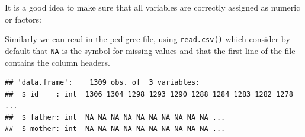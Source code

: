 \documentclass[
  12pt,
]{book}
\newenvironment{Shaded}{\begin{snugshade}}{\end{snugshade}}
\newcommand{\KeywordTok}[1]{\textcolor[rgb]{0.13,0.29,0.53}{\textbf{#1}}}
\newcommand{\NormalTok}[1]{#1}
\newcommand{\OperatorTok}[1]{\textcolor[rgb]{0.81,0.36,0.00}{\textbf{#1}}}
\newcommand{\StringTok}[1]{\textcolor[rgb]{0.31,0.60,0.02}{#1}}
\begin{document}
It is a good idea to make sure that all variables are correctly assigned as numeric or factors:

\begin{Shaded}
\end{Shaded}

Similarly we can read in the pedigree file, using \texttt{read.csv()} which consider by default that \texttt{NA} is the symbol for missing values and that the first line of the file contains the column headers.

\begin{verbatim}
## 'data.frame':    1309 obs. of  3 variables:
##  $ id    : int  1306 1304 1298 1293 1290 1288 1284 1283 1282 1278 ...
##  $ father: int  NA NA NA NA NA NA NA NA NA NA ...
##  $ mother: int  NA NA NA NA NA NA NA NA NA NA ...
\end{verbatim}

\begin{Shaded}
\end{Shaded}
\end{document}
